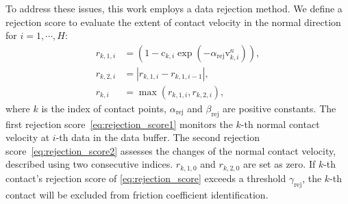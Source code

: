 To address these issues, this work employs a data rejection method.
We define a rejection score to evaluate the extent of  contact velocity in the normal direction for $i=1,\cdots,H$:
\begin{align}
\label{eq:rejection_score1}
r_{k,1,i} &= ( 1 - {\text{c}}_{k,i}\exp(-\alpha_\mathrm{rej}\text{v}^{n}_{k,i}) ), \\
\label{eq:rejection_score2}
r_{k,2,i} &= |r_{k,1,i} - r_{k,1,i-1}|,\\
\label{eq:rejection_score}
r_{k,i} &= \max(r_{k,1,i},r_{k,2,i}),
\end{align}
where $k$ is the index of contact points, $\alpha_\mathrm{rej}$ and $\beta_\mathrm{rej}$ are positive constants.
The first rejection score~\eqref{eq:rejection_score1} monitors the $k$-th normal contact velocity at $i$-th data in the data buffer. The second rejection score~\eqref{eq:rejection_score2} assesses the changes of the normal contact velocity, described using two consecutive indices. $r_{k,1,0}$ and $r_{k,2,0}$ are set as zero. If $k$-th contact's rejection score of \eqref{eq:rejection_score} exceeds a threshold $\gamma_\mathrm{rej}$, the $k$-th contact will be excluded from friction coefficient identification.
